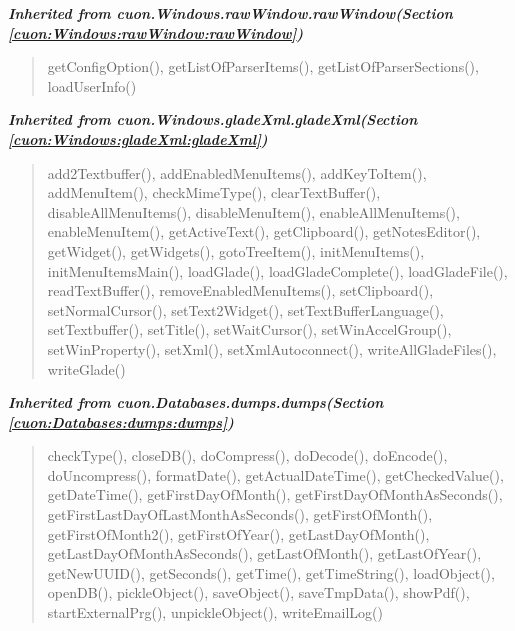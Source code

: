 \large{\textbf{\textit{Inherited from cuon.Windows.rawWindow.rawWindow\textit{(Section \ref{cuon:Windows:rawWindow:rawWindow})}}}}

\begin{quote}
getConfigOption(), getListOfParserItems(), getListOfParserSections(), loadUserInfo()
\end{quote}

\large{\textbf{\textit{Inherited from cuon.Windows.gladeXml.gladeXml\textit{(Section \ref{cuon:Windows:gladeXml:gladeXml})}}}}

\begin{quote}
add2Textbuffer(), addEnabledMenuItems(), addKeyToItem(), addMenuItem(), checkMimeType(), clearTextBuffer(), disableAllMenuItems(), disableMenuItem(), enableAllMenuItems(), enableMenuItem(), getActiveText(), getClipboard(), getNotesEditor(), getWidget(), getWidgets(), gotoTreeItem(), initMenuItems(), initMenuItemsMain(), loadGlade(), loadGladeComplete(), loadGladeFile(), readTextBuffer(), removeEnabledMenuItems(), setClipboard(), setNormalCursor(), setText2Widget(), setTextBufferLanguage(), setTextbuffer(), setTitle(), setWaitCursor(), setWinAccelGroup(), setWinProperty(), setXml(), setXmlAutoconnect(), writeAllGladeFiles(), writeGlade()
\end{quote}

\large{\textbf{\textit{Inherited from cuon.Databases.dumps.dumps\textit{(Section \ref{cuon:Databases:dumps:dumps})}}}}

\begin{quote}
checkType(), closeDB(), doCompress(), doDecode(), doEncode(), doUncompress(), formatDate(), getActualDateTime(), getCheckedValue(), getDateTime(), getFirstDayOfMonth(), getFirstDayOfMonthAsSeconds(), getFirstLastDayOfLastMonthAsSeconds(), getFirstOfMonth(), getFirstOfMonth2(), getFirstOfYear(), getLastDayOfMonth(), getLastDayOfMonthAsSeconds(), getLastOfMonth(), getLastOfYear(), getNewUUID(), getSeconds(), getTime(), getTimeString(), loadObject(), openDB(), pickleObject(), saveObject(), saveTmpData(), showPdf(), startExternalPrg(), unpickleObject(), writeEmailLog()
\end{quote}
